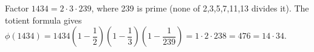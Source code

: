 Factor $1434=2\cdot3\cdot239$, where 239 is prime (none of 2,3,5,7,11,13 divides it). The totient formula gives $\phi(1434)=1434\left(1-\dfrac{1}{2}\right)\left(1-\dfrac{1}{3}\right)\left(1-\dfrac{1}{239}\right)=1\cdot2\cdot238=476=14\cdot34$.
